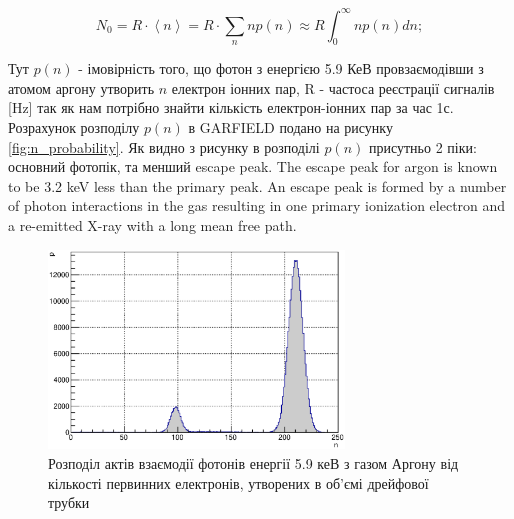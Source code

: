 \documentclass[pdftex,14pt]{scrartcl}
\def\mean#1{\left< #1 \right>}
\begin{document}
	\begin{equation}
	N_0 = R \cdot \mean{n} = R \cdot\sum_n n p(n) \approx R \int_0^\infty n p(n) dn;
	\end{equation}


	Тут $p(n)$ - імовірність того, що фотон з енергією 5.9 КеВ провзаємодівши з атомом аргону утворить $n$ електрон іонних пар, R - частоса реєстрації сигналів [Hz] так як нам потрібно знайти кількість електрон-іонних пар за час 1с.	
	Розрахунок розподілу $p(n)$ в GARFIELD подано на рисунку \ref{fig:n_probability}. Як видно з рисунку в розподілі $p(n)$ присутньо 2 піки: основний фотопік, та менший escape peak. 
	The escape peak for argon is known to be 3.2 keV less than the primary peak. An escape peak is formed by a number of photon interactions in the gas resulting in one primary ionization electron and a re-emitted X-ray with a long mean free path.
	
	\begin{figure}[!h]
	\centering
	\includegraphics[width=0.7\textwidth]{fe55neGamma}
	\caption{ Розподіл актів взаємодії фотонів енергії 5.9 кеВ з газом Аргону від кількості первинних електронів, утворених в об’ємі дрейфової трубки}
	\label{fig:fe55_n_probability}
	\end{figure}
	
	
\end{document}
